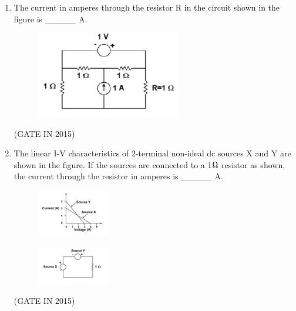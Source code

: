 \documentclass[journal]{IEEEtran}
\begin{document}
\begin{enumerate}
\item The current in amperes through the resistor R in the circuit shown in the figure is \_\_\_\_\_ A.
\begin{figure}[H]
    \centering
      \includegraphics[width=0.6\textwidth]{12.png} 
      \caption{}
    \label{fig:fig12} 
\end{figure}
\hfill(GATE IN 2015)

\item The linear I-V characteristics of 2-terminal non-ideal dc sources X and Y are shown in the figure. If the sources are connected to a 1$\ohm$ resistor as shown, the current through the resistor in amperes is \_\_\_\_\_ A.
\begin{multicols}{2}
\begin{figure}[H]
      \includegraphics[width=0.3\textwidth]{13.png} 
      \caption{}
    \label{fig:fig13} 
\end{figure}
\begin{figure}[H]
      \includegraphics[width=0.3\textwidth]{14.png} 
      \caption{}
    \label{fig:fig14} 
\end{figure}
\end{multicols}
 \hfill(GATE IN 2015)


\end{enumerate}
\end{document}
